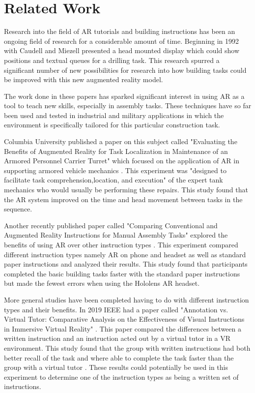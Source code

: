 \documentclass{vgtc}                          %
\begin{document}
\section{Related Work}

Research into the field of AR tutorials and building instructions has been an ongoing field of research for a considerable amount of time. Beginning in 1992 with Caudell and Miezell \cite{Caudell92} presented a head mounted display which could show positions and textual queues for a drilling task. This research spurred a significant number of new possibilities for research into how building tasks could be improved with this new augmented reality model.

The work done in these papers has sparked significant interest in using AR as a tool to teach new skills, especially in assembly tasks. These techniques have so far been used and tested in industrial and military applications in which the environment is specifically tailored for this particular construction task. 

Columbia University published a paper on this subject called "Evaluating the Benefits of Augmented Reality for Task Localization in Maintenance of an Armored Personnel Carrier Turret" which focused on the application of AR in supporting armored vehicle mechanics \cite{Henderson09}. This experiment was "designed to facilitate task comprehension,location, and execution" \cite{Henderson09} of the expert tank mechanics who would usually be performing these repairs. This study found that the AR system improved on the time and head movement between tasks in the sequence.

Another recently published paper called "Comparing Conventional and Augmented Reality Instructions for Manual Assembly Tasks" explored the benefits of using AR over other instruction types \cite{Blattgerste17}. This experiment compared different instruction types namely AR on phone and headset as well as standard paper instructions and analyzed their results. This study found that participants completed the basic building tasks faster with the standard paper instructions but made the fewest errors when using the Hololens AR headset. 

More general studies have been completed having to do with different instruction types and their benefits. In 2019 IEEE had a paper called "Annotation vs. Virtual Tutor: Comparative Analysis on the Effectiveness of Visual Instructions in Immersive Virtual Reality" \cite{Lee19}. This paper compared the differences between a written instruction and an instruction acted out by a virtual tutor in a VR environment. This study found that the group with written instructions had both better recall of the task and where able to complete the task faster than the group with a virtual tutor \cite{Lee19}. These results could potentially be used in this experiment to determine one of the instruction types as being a written set of instructions.
\end{document}
